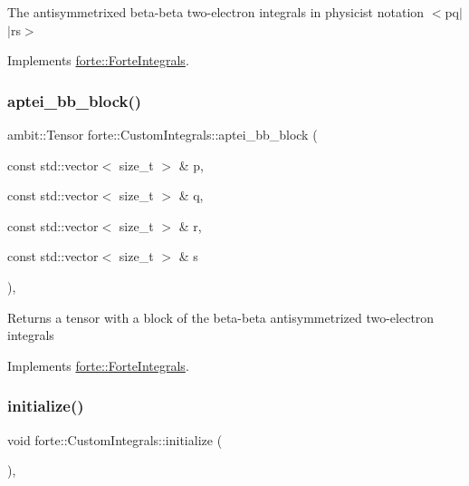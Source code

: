 The antisymmetrixed beta-\/beta two-\/electron integrals in physicist notation $<$pq$\vert$$\vert$rs$>$ 



Implements \mbox{\hyperlink{classforte_1_1_forte_integrals_a246225031c3799dc446f94e0e732c3ac}{forte\+::\+Forte\+Integrals}}.

\mbox{\label{classforte_1_1_custom_integrals_a71e29eaa0e9b1a84fe679e147c22398f}} 
\subsubsection{\texorpdfstring{aptei\+\_\+bb\+\_\+block()}{aptei\_bb\_block()}}
{\footnotesize\ttfamily ambit\+::\+Tensor forte\+::\+Custom\+Integrals\+::aptei\+\_\+bb\+\_\+block (\begin{DoxyParamCaption}\item[{const std\+::vector$<$ size\+\_\+t $>$ \&}]{p,  }\item[{const std\+::vector$<$ size\+\_\+t $>$ \&}]{q,  }\item[{const std\+::vector$<$ size\+\_\+t $>$ \&}]{r,  }\item[{const std\+::vector$<$ size\+\_\+t $>$ \&}]{s }\end{DoxyParamCaption})\hspace{0.3cm}{\ttfamily [override]}, {\ttfamily [virtual]}}

\begin{DoxyReturn}{Returns}
a tensor with a block of the beta-\/beta antisymmetrized two-\/electron integrals 
\end{DoxyReturn}


Implements \mbox{\hyperlink{classforte_1_1_forte_integrals_ae2799dc7cbfd456603a2b841b26582ab}{forte\+::\+Forte\+Integrals}}.

\mbox{\label{classforte_1_1_custom_integrals_a09375e296a39feb6a94c7cf4947d0206}} 
\subsubsection{\texorpdfstring{initialize()}{initialize()}}
{\footnotesize\ttfamily void forte\+::\+Custom\+Integrals\+::initialize (\begin{DoxyParamCaption}{ }\end{DoxyParamCaption})\hspace{0.3cm}{\ttfamily [override]}, {\ttfamily [virtual]}}



